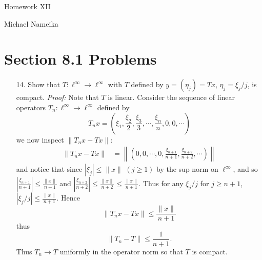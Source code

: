 \documentclass{article}
\begin{document}
\begin{center}
    {\Huge Homework XII}
    \vspace{0.5cm}

    {\Large Michael Nameika}
\end{center}

\section*{Section 8.1 Problems}
\begin{itemize}
    \item[14.] Show that $T: \ell^{\infty} \to \ell^{\infty}$ with $T$ defined by $y = (\eta_j) = Tx$, $\eta_j = \xi_j/j$, is compact.
    \newline\newline
    \textit{Proof:} Note that $T$ is linear. Consider the sequence of linear operators $T_n : \ell^{\infty} \to \ell^{\infty}$ defined by
    \[T_nx = \left(\xi_1, \frac{\xi_2}{2}, \frac{\xi_3}{3}, \cdots, \frac{\xi_n}{n}, 0, 0, \cdots\right)\]
    we now inspect $\|T_nx - Tx\|$:
    \begin{align*}
        \|T_nx - Tx\| &= \left\|\left(0,0,\cdots,0,\frac{\xi_{n+1}}{n+1}, \frac{\xi_{n+2}}{n+2}, \cdots\right)\right\|      
    \end{align*}
    and notice that since $|\xi_j| \leq \|x\|$ $(j \geq 1)$ by the sup norm on $\ell^{\infty}$, and so $\left|\tfrac{\xi_{n+1}}{n+1}\right| \leq \tfrac{\|x\|}{n+1}$ and $\left|\tfrac{\xi_{n+2}}{n+2}\right| \leq \tfrac{\|x\|}{n+2} \leq \tfrac{\|x\|}{n+1}$. Thus for any $\xi_j/j$ for $j \geq n+1$, $|\xi_j/j| \leq \tfrac{\|x\|}{n+1}$. Hence
    \[\|T_nx - Tx\| \leq \frac{\|x\|}{n+1}\]
    thus
    \[\|T_n - T\| \leq \frac{1}{n+1}.\]
    Thus $T_n \to T$ uniformly in the operator norm so that $T$ is compact.
    
\end{itemize}
\end{document}
